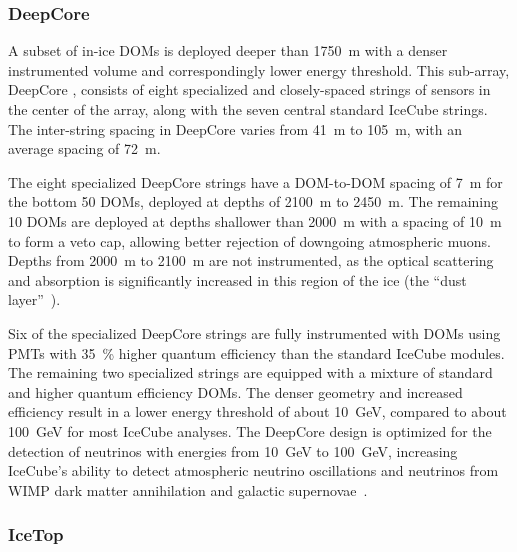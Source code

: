 \subsubsection{DeepCore}

A subset of in-ice DOMs is deployed deeper than \SI{1750}{\meter} with a denser instrumented volume and
correspondingly lower energy threshold. This
sub-array, DeepCore \cite{ICECUBE:DC}, consists of eight specialized and
closely-spaced strings of sensors in the center of the array, along with
the seven central standard IceCube strings. The inter-string spacing
in DeepCore varies from \SI{41}{\meter} to \SI{105}{\meter}, with an
average spacing of \SI{72}{\meter}.

The eight specialized DeepCore strings have a DOM-to-DOM spacing of
\SI{7}{\meter} for the bottom 50 DOMs, deployed at depths of
\SI{2100}{\meter} to \SI{2450}{\meter}.  The remaining 10 DOMs are
deployed at depths shallower than \SI{2000}{\meter} with a spacing of
\SI{10}{\meter} to form a veto cap, allowing better rejection of downgoing
atmospheric muons.  Depths from \SI{2000}{\meter} to \SI{2100}{\meter}
are not instrumented, as the optical scattering and absorption is
significantly increased in this region of the ice (the ``dust layer''~\cite{Aartsen:2013rt}).

Six of the specialized DeepCore strings are fully instrumented with
DOMs using PMTs with \SI{35}{\%} higher quantum efficiency than the
standard IceCube modules. The remaining two specialized strings are
equipped with a mixture of standard and higher quantum efficiency DOMs. The denser geometry and increased efficiency
result in a lower energy threshold of about
\SI{10}{\giga\electronvolt}, compared to about
\SI{100}{\giga\electronvolt} for most IceCube analyses. The DeepCore design
is optimized for the detection of neutrinos with energies
from \SI{10}{\giga\electronvolt} to \SI{100}{\giga\electronvolt},
increasing IceCube's ability to detect atmospheric neutrino
oscillations and neutrinos from WIMP dark matter annihilation and galactic
supernovae~\cite{ICECUBE:DC}. 

\subsubsection{IceTop}


